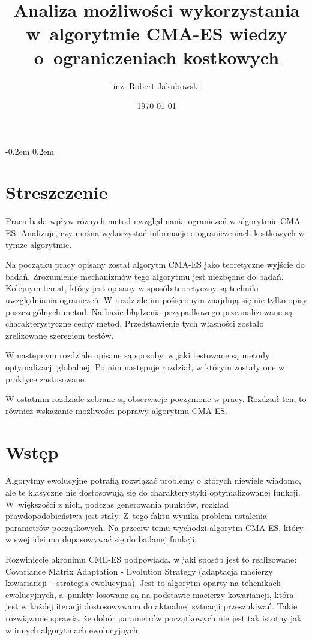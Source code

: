 \documentclass{mini}
\title{Analiza możliwości wykorzystania w~algorytmie CMA-ES wiedzy o~ograniczeniach kostkowych}
\author{inż. Robert Jakubowski}
\date{\today}
\begin{document}
\maketitle

\pagebreak
\thispagestyle{empty}

\openup -0.2em %
\tableofcontents
\openup 0.2em %

\thispagestyle{empty}
\raggedbottom
\pagebreak


\section{Streszczenie}

Praca bada wpływ różnych metod uwzględniania ograniczeń w algorytmie CMA-ES. Analizuje, czy można wykorzystać informacje o ograniczeniach kostkowych w tymże algorytmie.

Na początku pracy opisany został algorytm CMA-ES jako teoretyczne wyjście do badań. Zrozumienie mechanizmów tego algorytmu jest niezbędne do badań. Kolejnym temat, który jest opisany w sposób teoretyczny są techniki uwzględniania ograniczeń. W rozdziale im pośięconym znajdują się nie tylko opisy poszczególnych metod. Na bazie błądzenia przypadkowego przeanalizowane są charakterystyczne cechy metod. Przedstawienie tych własności zostało zrelizowane szeregiem testów.

W następnym rozdziale opisane są sposoby, w jaki testowane są metody optymalizacji globalnej. Po nim następuje rozdział, w którym zostały one w praktyce zastosowane.

W ostatnim rozdziale zebrane są obserwacje poczynione w pracy. Rozdzaił ten, to również wskazanie możliwości poprawy algorytmu CMA-ES.

\pagebreak

\section{Wstęp}
Algorytmy ewolucyjne potrafią rozwiązać problemy o których niewiele wiadomo, ale te klasyczne nie dostosowują się do charakterystyki optymalizowanej funkcji. W~większości z nich, podczas generowania punktów, rozkład prawdopodobieństwa jest stały. Z~tego faktu wynika problem ustalenia parametrów początkowych. Na przeciw temu wychodzi algorytm CMA-ES, który w swej idei ma dopasowywać się do badanej funkcji.

Rozwinięcie akronimu CME-ES podpowiada, w jaki sposób jest to realizowane: Covariance Matrix Adaptation - Evolution Strategy (adaptacja macierzy kowariancji -~strategia ewolucyjna). Jest to algorytm oparty na tehcnikach ewolucyjnych, a~punkty losowane są na podstawie macierzy kowariancji, która jest w każdej iteracji dostosowywana do aktualnej sytuacji przeszukiwań. Takie rozwiązanie sprawia, że dobór parametrów początkowych nie jest tak istotny jak w innych algorytmach ewolucyjnych.
\end{document}
